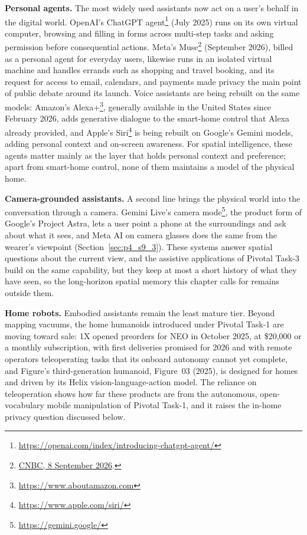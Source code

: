 \textbf{Personal agents.} The most widely used assistants now act on a user's behalf in the digital world. OpenAI's ChatGPT agent\footnote{\url{https://openai.com/index/introducing-chatgpt-agent/}} (July 2025) runs on its own virtual computer, browsing and filling in forms across multi-step tasks and asking permission before consequential actions. Meta's Muse\footnote{\href{https://www.cnbc.com/2026/09/08/meta-personal-ai-agents-public-reckoning-privacy-safety.html}{CNBC, 8 September 2026}.} (September 2026), billed as a personal agent for everyday users, likewise runs in an isolated virtual machine and handles errands such as shopping and travel booking, and its request for access to email, calendars, and payments made privacy the main point of public debate around its launch. Voice assistants are being rebuilt on the same models: Amazon's Alexa+\footnote{\url{https://www.aboutamazon.com}}, generally available in the United States since February 2026, adds generative dialogue to the smart-home control that Alexa already provided, and Apple's Siri\footnote{\url{https://www.apple.com/siri/}} is being rebuilt on Google's Gemini models, adding personal context and on-screen awareness. For spatial intelligence, these agents matter mainly as the layer that holds personal context and preference; apart from smart-home control, none of them maintains a model of the physical home.

\textbf{Camera-grounded assistants.} A second line brings the physical world into the conversation through a camera. Gemini Live's camera mode\footnote{\url{https://gemini.google/}}, the product form of Google's Project Astra, lets a user point a phone at the surroundings and ask about what it sees, and Meta AI on camera glasses does the same from the wearer's viewpoint (Section~\ref{sec:p4_s9_3}). These systems answer spatial questions about the current view, and the assistive applications of Pivotal Task-3 build on the same capability, but they keep at most a short history of what they have seen, so the long-horizon spatial memory this chapter calls for remains outside them.

\textbf{Home robots.} Embodied assistants remain the least mature tier. Beyond mapping vacuums, the home humanoids introduced under Pivotal Task-1 are moving toward sale: 1X opened preorders for NEO in October 2025, at \$20{,}000 or a monthly subscription, with first deliveries promised for 2026 and with remote operators teleoperating tasks that its onboard autonomy cannot yet complete, and Figure's third-generation humanoid, Figure~03 (2025), is designed for homes and driven by its Helix vision-language-action model. The reliance on teleoperation shows how far these products are from the autonomous, open-vocabulary mobile manipulation of Pivotal Task-1, and it raises the in-home privacy question discussed below.

